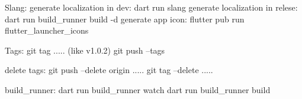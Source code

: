 Slang: 
     generate localization in dev: dart run slang
     generate localization in relese: dart run build_runner build -d
     generate app icon: flutter pub run flutter_launcher_icons

Tags: 
     git tag ..... (like v1.0.2)
     git push --tags

     delete tags:
          git push --delete origin .....
          git tag --delete .....

build_runner:
     dart run build_runner watch
     dart run build_runner build

